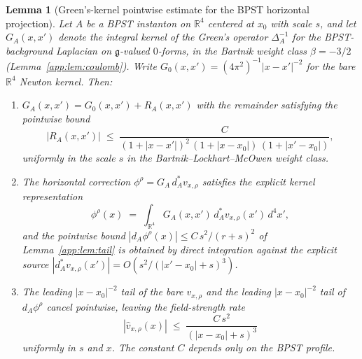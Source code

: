\documentclass[11pt,letterpaper]{article}
\newtheorem{lemma}[theorem]{Lemma}
\theoremstyle{definition}
\newcommand{\bbR}{\mathbb{R}}
\newcommand{\fg}{\mathfrak{g}}
\newcommand{\Lap}{\Delta}
\begin{document}
\begin{lemma}[Green's-kernel pointwise estimate for the BPST horizontal projection]\label{app:lem:green}
Let $A$ be a BPST instanton on $\bbR^4$ centered at $x_0$ with scale $s$, and let $G_A(x,x')$ denote the integral kernel of the Green's operator $\Lap_A^{-1}$ for the BPST-background Laplacian on $\fg$-valued $0$-forms, in the Bartnik weight class $\beta = -3/2$ (Lemma~\ref{app:lem:coulomb}). Write $G_0(x,x') = (4\pi^2)^{-1}|x-x'|^{-2}$ for the bare $\bbR^4$ Newton kernel. Then:
\begin{enumerate}\setlength{\itemsep}{2pt}
\item[\textup{(a)}] $G_A(x,x') = G_0(x,x') + R_A(x,x')$ with the remainder satisfying the pointwise bound
\[
|R_A(x, x')| \;\le\; \frac{C}{(1+|x-x'|)^{2}\,(1+|x-x_0|)\,(1+|x'-x_0|)},
\]
uniformly in the scale $s$ in the Bartnik--Lockhart--McOwen weight class.
\item[\textup{(b)}] The horizontal correction $\phi^\rho = G_A\,d_A^*v_{x,\rho}$ satisfies the explicit kernel representation
\[
\phi^\rho(x) \;=\; \int_{\bbR^4} G_A(x, x')\,d_A^* v_{x,\rho}(x')\,d^4x',
\]
and the pointwise bound $|d_A\phi^\rho(x)| \le C\,s^2/(r+s)^2$ of Lemma~\ref{app:lem:tail} is obtained by direct integration against the explicit source $|d_A^*v_{x,\rho}(x')| = O(s^2/(|x'-x_0|+s)^3)$.
\item[\textup{(c)}] The leading $|x-x_0|^{-2}$ tail of the bare $v_{x,\rho}$ and the leading $|x-x_0|^{-2}$ tail of $d_A\phi^\rho$ cancel pointwise, leaving the field-strength rate
\[
|\hat v_{x,\rho}(x)| \;\le\; \frac{C\,s^2}{(|x-x_0|+s)^3}
\]
uniformly in $s$ and $x$. The constant $C$ depends only on the BPST profile.
\end{enumerate}
\end{lemma}
\end{document}
